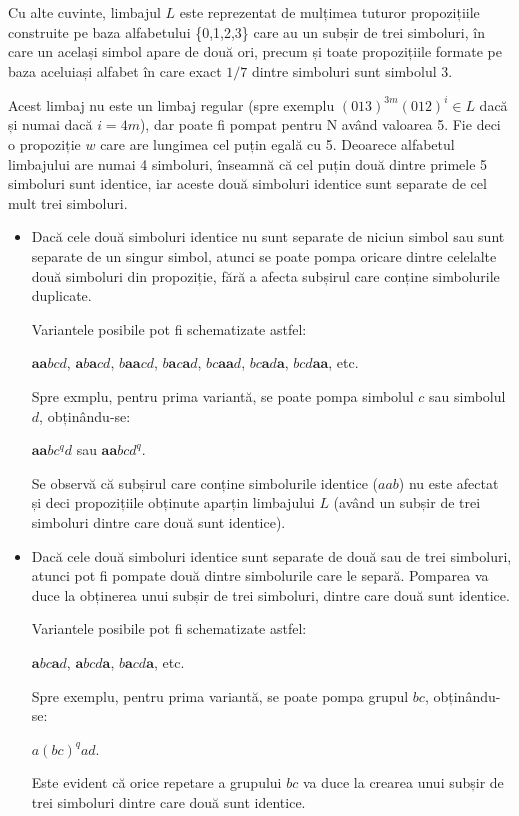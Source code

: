 Cu alte cuvinte, limbajul $L$ este reprezentat de mulțimea tuturor propozițiile construite pe baza alfabetului \{0,1,2,3\} care au un subșir de trei simboluri, în care un același simbol apare de două ori, precum și toate propozițiile formate pe baza aceluiași alfabet în care exact $1/7$ dintre simboluri sunt simbolul 3.

Acest limbaj nu este un limbaj regular (spre exemplu $(013)^{3m}(012)^{i} \in L$ dacă și numai dacă $i=4m$), dar poate fi pompat pentru N având valoarea 5. Fie deci o propoziție $w$ care are lungimea cel puțin egală cu 5. Deoarece alfabetul limbajului are numai 4 simboluri, înseamnă că cel puțin două dintre primele 5 simboluri sunt identice, iar aceste două simboluri identice sunt separate de cel mult trei simboluri. 

\begin{itemize}
\item
Dacă cele două simboluri identice nu sunt separate de niciun simbol sau sunt separate de un singur simbol, atunci se poate pompa oricare dintre celelalte două simboluri din propoziție, fără a afecta subșirul care conține simbolurile duplicate.

Variantele posibile pot fi schematizate astfel:

$\textbf{aa}bcd$, $\textbf{a}b\textbf{a}cd$, $b\textbf{aa}cd$, $b\textbf{a}c\textbf{a}d$, $bc\textbf{aa}d$, $bc\textbf{a}d\textbf{a}$, $bcd\textbf{aa}$, etc.

Spre exmplu, pentru prima variantă, se poate pompa simbolul $c$ sau simbolul $d$, obținându-se:

$\textbf{aa}bc^q d$ sau $\textbf{aa}bcd^q$.

Se observă că subșirul care conține simbolurile identice ($aab$) nu este afectat și deci propozițiile obținute aparțin limbajului $L$ (având un subșir de trei simboluri dintre care două sunt identice).
\item
Dacă cele două simboluri identice sunt separate de două sau de trei simboluri, atunci pot fi pompate două dintre simbolurile care le separă. Pomparea va duce la obținerea unui subșir de trei simboluri, dintre care două sunt identice.

Variantele posibile pot fi schematizate astfel:

$\textbf{a}bc\textbf{a}d$, $\textbf{a}bcd\textbf{a}$, $b\textbf{a}cd\textbf{a}$, etc.

Spre exemplu, pentru prima variantă, se poate pompa grupul $bc$, obținându-se:

$a(bc)^q ad$.

Este evident că orice repetare a grupului $bc$ va duce la crearea unui subșir de trei simboluri dintre care două sunt identice.
\end{itemize}

